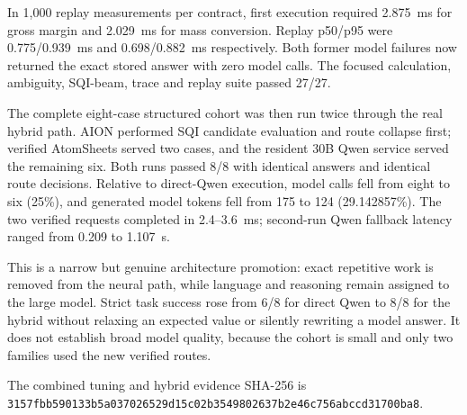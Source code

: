 In 1{,}000 replay measurements per contract, first execution required 2.875~ms
for gross margin and 2.029~ms for mass conversion.  Replay p50/p95 were
0.775/0.939~ms and 0.698/0.882~ms respectively.  Both former model failures now
returned the exact stored answer with zero model calls.  The focused calculation,
ambiguity, SQI-beam, trace and replay suite passed 27/27.

The complete eight-case structured cohort was then run twice through the real
hybrid path.  AION performed SQI candidate evaluation and route collapse first;
verified AtomSheets served two cases, and the resident 30B Qwen service served
the remaining six.  Both runs passed 8/8 with identical answers and identical
route decisions.  Relative to direct-Qwen execution, model calls fell from eight
to six (25\%), and generated model tokens fell from 175 to 124 (29.142857\%).
The two verified requests completed in 2.4--3.6~ms; second-run Qwen fallback
latency ranged from 0.209 to 1.107~s.

This is a narrow but genuine architecture promotion: exact repetitive work is
removed from the neural path, while language and reasoning remain assigned to
the large model.  Strict task success rose from 6/8 for direct Qwen to 8/8 for
the hybrid without relaxing an expected value or silently rewriting a model
answer.  It does not establish broad model quality, because the cohort is small
and only two families used the new verified routes.

The combined tuning and hybrid evidence SHA-256 is
\texttt{3157fbb590133b5a037026529d15c02b3549802637b2e46c756abccd31700ba8}.

